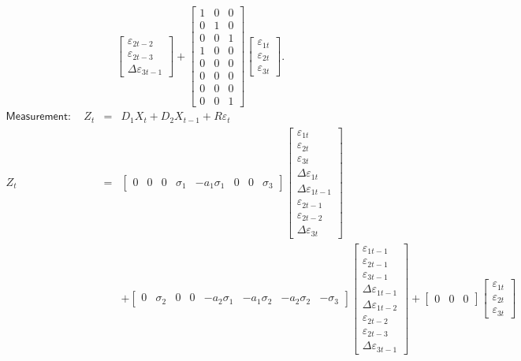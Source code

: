 \documentclass[a4paper,12pt]{article}
\begin{document}
\begin{align}
\begin{bmatrix}
\varepsilon _{2t-2} \\
\varepsilon _{2t-3} \\
\Delta \varepsilon _{3t-1}%
\end{bmatrix}%
+%
\begin{bmatrix}
1 & 0 & 0 \\
0 & 1 & 0 \\
0 & 0 & 1 \\
1 & 0 & 0 \\
0 & 0 & 0 \\
0 & 0 & 0 \\
0 & 0 & 0 \\
0 & 0 & 1%
\end{bmatrix}%
\begin{bmatrix}
\varepsilon _{1t} \\
\varepsilon _{2t} \\
\varepsilon _{3t}%
\end{bmatrix}%
.
\end{align}%
\begin{eqnarray*}
\mathsf{Measurement}:\quad Z_{t} &=&D_{1}X_{t}+D_{2}X_{t-1}+R\varepsilon _{t}
\\[-15mm]
Z_{t} &=&%
\begin{bmatrix}
0 & 0 & 0 & \sigma _{1} & -a_{1}\sigma _{1} & 0 & 0 & \sigma _{3}%
\end{bmatrix}%
\begin{bmatrix}
\varepsilon _{1t} \\
\varepsilon _{2t} \\
\varepsilon _{3t} \\
\Delta \varepsilon _{1t} \\
\Delta \varepsilon _{1t-1} \\
\varepsilon _{2t-1} \\
\varepsilon _{2t-2} \\
\Delta \varepsilon _{3t}%
\end{bmatrix}
\\[-15mm]
&&+%
\begin{bmatrix}
0 & \sigma _{2} & 0 & 0 & -a_{2}\sigma _{1} & -a_{1}\sigma _{2} &
-a_{2}\sigma _{2} & -\sigma _{3}%
\end{bmatrix}%
\begin{bmatrix}
\varepsilon _{1t-1} \\
\varepsilon _{2t-1} \\
\varepsilon _{3t-1} \\
\Delta \varepsilon _{1t-1} \\
\Delta \varepsilon _{1t-2} \\
\varepsilon _{2t-2} \\
\varepsilon _{2t-3} \\
\Delta \varepsilon _{3t-1}%
\end{bmatrix}%
+%
\begin{bmatrix}
0 & 0 & 0%
\end{bmatrix}%
\begin{bmatrix}
\varepsilon _{1t} \\
\varepsilon _{2t} \\
\varepsilon _{3t}%
\end{bmatrix}%
\end{eqnarray*}%
$\allowbreak $
\end{document}
